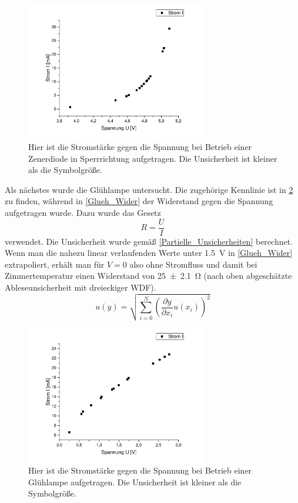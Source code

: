 \documentclass[
	a4paper,
	12pt,
	pagesize,
	ngerman
]{scrartcl}
\begin{document}
	\begin{figure}[H]
		\includegraphics[width=0.7\textwidth]{Zener_Sperr}
		\centering
		\caption{Hier ist die Stromstärke gegen die Spannung bei Betrieb einer Zenerdiode in Sperrrichtung aufgetragen. Die Unsicherheit ist kleiner als die Symbolgröße.}
		\label{Zener_Sperr}
		\centering
	\end{figure}
	Als nächstes wurde die Glühlampe untersucht.
	Die zugehörige Kennlinie ist in \cref{Glueh_Kenn} zu finden, während in \cref{Glueh_Wider} der Widerstand gegen die Spannung aufgetragen wurde.
	Dazu wurde das Gesetz
	\begin{equation*}
		R=\frac{U}{I}
	\end{equation*}
	verwendet.
	Die Unsicherheit wurde gemäß \cref{Partielle_Unsicherheiten} berechnet.
	Wenn man die nahezu linear verlaufenden Werte unter \SI{1,5}{V} in \cref{Glueh_Wider} extrapoliert, erhält man für $V=0$ also ohne Stromfluss und damit bei Zimmertemperatur einen Widerstand von \SI{25\pm2,1}{\ohm} (nach oben abgeschätzte Ableseunsicherheit mit dreieckiger WDF).
	\begin{equation}
	u(y) = \sqrt{  \sum_{i=0}^{N} \left( \frac{\partial y}{\partial x_i}u(x_i)\right)^2  }
	\label{Partielle_Unsicherheiten}
	\end{equation}
	\begin{figure}[H]
		\includegraphics[width=0.7\textwidth]{Glueh_Kenn}
		\centering
		\caption{Hier ist die Stromstärke gegen die Spannung bei Betrieb einer Glühlampe aufgetragen. Die Unsicherheit ist kleiner als die Symbolgröße.}
		\label{Glueh_Kenn}
		\centering
	\end{figure}
\end{document}
